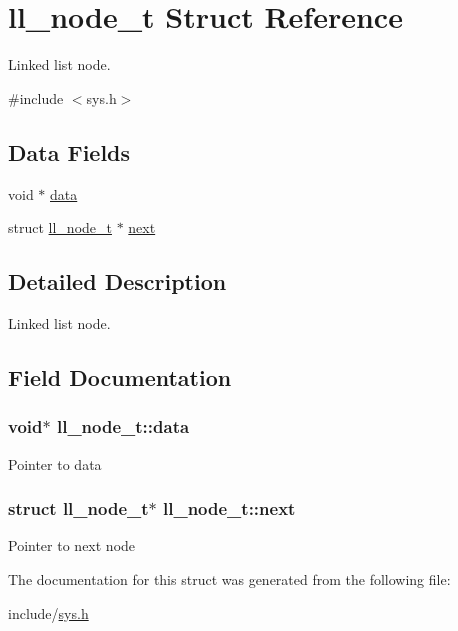 \hypertarget{structll__node__t}{}\section{ll\+\_\+node\+\_\+t Struct Reference}
\label{structll__node__t}


Linked list node.  




{\ttfamily \#include $<$sys.\+h$>$}

\subsection*{Data Fields}
\begin{DoxyCompactItemize}
\item 
void $\ast$ \hyperlink{structll__node__t_a36aad8fd0c3ba441786bc4c8215f6fcc}{data}
\item 
struct \hyperlink{structll__node__t}{ll\+\_\+node\+\_\+t} $\ast$ \hyperlink{structll__node__t_a1e73ee32269c7b6cd253779dfa00d49d}{next}
\end{DoxyCompactItemize}


\subsection{Detailed Description}
Linked list node. 

\subsection{Field Documentation}
\subsubsection[{\texorpdfstring{data}{data}}]{\setlength{\rightskip}{0pt plus 5cm}void$\ast$ ll\+\_\+node\+\_\+t\+::data}\hypertarget{structll__node__t_a36aad8fd0c3ba441786bc4c8215f6fcc}{}\label{structll__node__t_a36aad8fd0c3ba441786bc4c8215f6fcc}
Pointer to data 
\subsubsection[{\texorpdfstring{next}{next}}]{\setlength{\rightskip}{0pt plus 5cm}struct {\bf ll\+\_\+node\+\_\+t}$\ast$ ll\+\_\+node\+\_\+t\+::next}\hypertarget{structll__node__t_a1e73ee32269c7b6cd253779dfa00d49d}{}\label{structll__node__t_a1e73ee32269c7b6cd253779dfa00d49d}
Pointer to next node 

The documentation for this struct was generated from the following file\+:\begin{DoxyCompactItemize}
\item 
include/\hyperlink{sys_8h}{sys.\+h}\end{DoxyCompactItemize}
